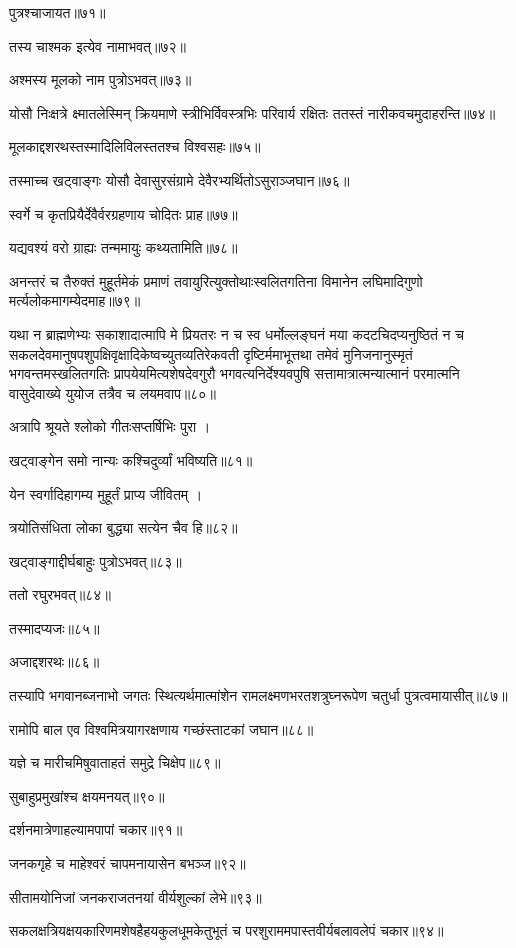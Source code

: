 पुत्रश्चाजायत॥७१॥

तस्य चाश्मक इत्येव नामाभवत्॥७२॥

अश्मस्य मूलको नाम पुत्रोऽभवत्॥७३॥

योसौ निःक्षत्रे क्ष्मातलेस्मिन् क्रियमाणे स्त्रीभिर्विवस्त्रभिः परिवार्य रक्षितः ततस्तं
नारीकवचमुदाहरन्ति॥७४॥

मूलकाद्दशरथस्तस्मादिलिविलस्ततश्च विश्वसहः॥७५॥

तस्माच्च खट्वाङ्गः योसौ देवासुरसंग्रामे देवैरभ्यर्थितोऽसुराञ्जघान॥७६॥

स्वर्गे च कृतप्रियैर्देवैर्वरग्रहणाय चोदितः प्राह॥७७॥

यद्यवश्यं वरो ग्राह्यः तन्ममायुः कथ्यतामिति॥७८॥

अनन्तरं च तैरुक्तं मुहूर्तमेकं प्रमाणं तवायुरित्युक्तोथाःस्वलितगतिना विमानेन लघिमादिगुणो
मर्त्यलोकमागम्येदमाह॥७९॥

यथा न ब्राह्मणेभ्यः सकाशादात्मापि मे प्रियतरः न च स्व धर्मोल्लङ्घनं मया
कदटचिदप्यनुष्ठितं न च सकलदेवमानुषपशुपक्षिवृक्षादिकेष्वच्युतव्यतिरेकवती दृष्टिर्ममाभूत्तथा तमेवं
मुनिजनानुस्मृतं भगवन्तमस्खलितगतिः प्रापयेयमित्यशेषदेवगुरौ भगवत्यनिर्देश्यवपुषि
सत्तामात्रात्मन्यात्मानं परमात्मनि वासुदेवाख्ये युयोज तत्रैव च लयमवाप॥८०॥

अत्रापि श्रूयते श्लोको गीतःसप्तर्षिभिः पुरा ।

खट्वाङ्गेन समो नान्यः कश्चिदुर्व्यां भविष्यति॥८१॥

येन स्वर्गादिहागम्य मुहूर्तं प्राप्य जीवितम् ।

त्रयोतिसंधिता लोका बुद्ध्या सत्येन चैव हि॥८२॥

खट्वाङ्गाद्दीर्घबाहुः पुत्रोऽभवत्॥८३॥

ततो रघुरभवत्॥८४॥

तस्मादप्यजः॥८५॥

अजाद्दशरथः॥८६॥

तस्यापि भगवानब्जनाभो जगतः स्थित्यर्थमात्मांशेन रामलक्ष्मणभरतशत्रुघ्नरूपेण चतुर्धा
पुत्रत्वमायासीत्॥८७॥

रामोपि बाल एव विश्वमित्रयागरक्षणाय गच्छंस्ताटकां जघान॥८८॥

यज्ञे च मारीचमिषुवाताहतं समुद्रे चिक्षेप॥८९॥

सुबाहुप्रमुखांश्च क्षयमनयत्॥९०॥

दर्शनमात्रेणाहल्यामपापां चकार॥९१॥

जनकगृहे च माहेश्वरं चापमनायासेन बभञ्ज॥९२॥

सीतामयोनिजां जनकराजतनयां वीर्यशुल्कां लेभे॥९३॥

सकलक्षत्रियक्षयकारिणमशेषहैहयकुलधूमकेतुभूतं च परशुराममपास्तवीर्यबलावलेपं चकार॥९४॥


